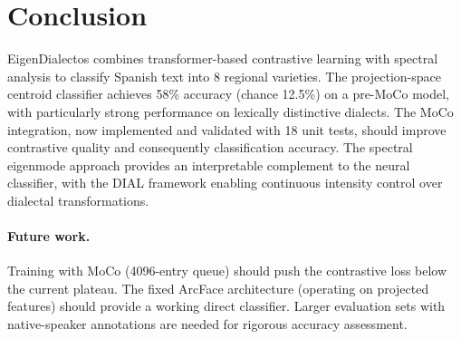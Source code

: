 \documentclass[11pt,a4paper]{article}
\begin{document}
\section{Conclusion}

EigenDialectos combines transformer-based contrastive learning with spectral
analysis to classify Spanish text into 8 regional varieties. The
projection-space centroid classifier achieves 58\% accuracy (chance 12.5\%)
on a pre-MoCo model, with particularly strong performance on lexically
distinctive dialects. The MoCo integration, now implemented and validated
with 18 unit tests, should improve contrastive quality and consequently
classification accuracy. The spectral eigenmode approach provides an
interpretable complement to the neural classifier, with the DIAL framework
enabling continuous intensity control over dialectal transformations.

\paragraph{Future work.}
Training with MoCo (4096-entry queue) should push the contrastive loss
below the current plateau. The fixed ArcFace architecture (operating on
projected features) should provide a working direct classifier. Larger
evaluation sets with native-speaker annotations are needed for rigorous
accuracy assessment.


\end{document}
